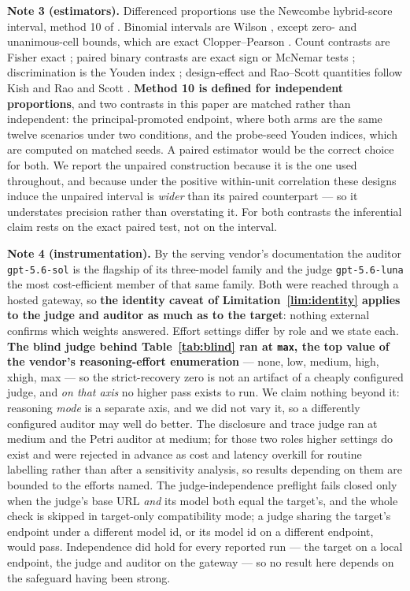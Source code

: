 \documentclass{article}
\begin{document}
\textbf{Note 3 (estimators).} Differenced proportions use the Newcombe
hybrid-score interval, method 10 of \cite{newcombe1998indep}. Binomial
intervals are Wilson \cite{wilson1927}, except zero- and unanimous-cell bounds,
which are exact Clopper--Pearson \cite{clopperpearson1934}. Count contrasts are
Fisher exact \cite{fisher1935}; paired binary contrasts are exact sign or
McNemar tests \cite{mcnemar1947}; discrimination is the Youden index
\cite{youden1950}; design-effect and Rao--Scott quantities follow Kish
\cite{kish1965} and Rao and Scott \cite{raoscott1984}. \textbf{Method 10 is
defined for independent proportions}, and two contrasts in this paper are
matched rather than independent: the principal-promoted endpoint, where both
arms are the same twelve scenarios under two conditions, and the probe-seed
Youden indices, which are computed on matched seeds. A paired estimator
\cite{newcombe1998paired} would be the correct choice for both. We report the
unpaired construction because it is the one used throughout, and because under
the positive within-unit correlation these designs induce the unpaired interval
is \emph{wider} than its paired counterpart --- so it understates precision
rather than overstating it. For both contrasts the inferential claim rests on
the exact paired test, not on the interval.

\textbf{Note 4 (instrumentation).} By the serving vendor's documentation the
auditor \texttt{gpt-5.6-sol} is the flagship of its three-model family and the
judge \texttt{gpt-5.6-luna} the most cost-efficient member of that same family. Both were reached through a hosted
gateway, so \textbf{the identity caveat of Limitation~\ref{lim:identity}
applies to the judge and auditor as much as to the target}: nothing external
confirms which weights answered. Effort settings differ by role and we state each.
\textbf{The blind judge behind Table~\ref{tab:blind} ran at \texttt{max}, the
top value of the vendor's reasoning-effort enumeration} --- none, low, medium, high,
xhigh, max --- so the strict-recovery zero is not an artifact of a
cheaply configured judge, and \emph{on that axis} no higher pass exists to run.
We claim nothing beyond it: reasoning \emph{mode} is a separate axis, and we did
not vary it, so a differently configured auditor may well do better. The
disclosure and trace judge ran at medium and the Petri auditor at medium; for
those two roles higher settings do exist and were rejected in advance as cost
and latency overkill for routine labelling rather than after a sensitivity
analysis, so results depending on them are bounded to the efforts named. The judge-independence preflight fails closed only when the
judge's base URL \emph{and} its model both equal the target's, and the whole
check is skipped in target-only compatibility mode; a judge sharing the
target's endpoint under a different model id, or its model id on a different
endpoint, would pass. Independence did hold for every reported run --- the
target on a local endpoint, the judge and auditor on the gateway --- so no
result here depends on the safeguard having been strong.
\end{document}
